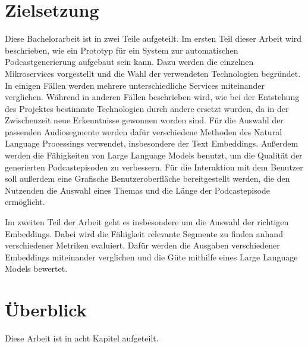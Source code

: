 



\section{Zielsetzung}

Diese Bachelorarbeit ist in zwei Teile aufgeteilt.
Im ersten Teil dieser Arbeit wird beschrieben, wie ein Prototyp für ein System zur automatischen Podcastgenerierung aufgebaut sein kann.
Dazu werden die einzelnen Mikroservices vorgestellt und die Wahl der verwendeten Technologien begründet.
In einigen Fällen werden mehrere unterschiedliche Services miteinander verglichen.
Während in anderen Fällen beschrieben wird, wie bei der Entstehung des Projektes bestimmte Technologien durch andere ersetzt wurden, da in der Zwischenzeit neue Erkenntnisse gewonnen worden sind.
Für die Auswahl der passenden Audiosegmente werden dafür verschiedene Methoden des Natural Language Processings verwendet, insbesondere der Text Embeddings.
Außerdem werden die Fähigkeiten von Large Language Models benutzt, um die Qualität der generierten Podcastepisoden zu verbessern.
Für die Interaktion mit dem Benutzer soll außerdem eine Grafische Benutzeroberfläche bereitgestellt werden, die den Nutzenden die Auswahl eines Themas und die Länge der Podcastepisode ermöglicht.

Im zweiten Teil der Arbeit geht es insbesondere um die Auswahl der richtigen Embeddings.
Dabei wird die Fähigkeit relevante Segmente zu finden anhand verschiedener Metriken evaluiert.
Dafür werden die Ausgaben verschiedener Embeddings miteinander verglichen und die Güte mithilfe eines Large Language Models bewertet.


\section{Überblick}

Diese Arbeit ist in acht Kapitel aufgeteilt.

